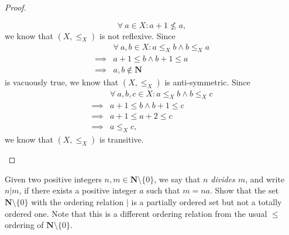\begin{proof}
\begin{enumerate}
              \[
                  \forall\ a \in X : a + 1 \not\leq a,
              \]
              we know that \((X, \leq_X)\) is not reflexive.
              Since
              \begin{align*}
                           & \forall\ a, b \in X : a \leq_X b \land b \leq_X a \\
                  \implies & a + 1 \leq b \land b + 1 \leq a                   \\
                  \implies & a, b \notin \mathbf{N}
              \end{align*}
              is vacuously true, we know that \((X, \leq_X)\) is anti-symmetric.
              Since
              \begin{align*}
                           & \forall\ a, b, c \in X : a \leq_X b \land b \leq_X c \\
                  \implies & a + 1 \leq b \land b + 1 \leq c                      \\
                  \implies & a + 1 \leq a + 2 \leq c                              \\
                  \implies & a \leq_X c,
              \end{align*}
              we know that \((X, \leq_X)\) is transitive.
    \end{enumerate}
\end{proof}

\begin{exercise}\label{ex 8.5.3}
    Given two positive integers \(n, m \in \mathbf{N} \setminus \{0\}\), we say that \emph{\(n\) divides \(m\)}, and write \(n | m\), if there exists a positive integer \(a\) such that \(m = na\).
    Show that the set \(\mathbf{N} \setminus \{0\}\) with the ordering relation \(|\) is a partially ordered set but not a totally ordered one.
    Note that this is a different ordering relation from the usual \(\leq\) ordering of \(\mathbf{N} \setminus \{0\}\).
\end{exercise}

